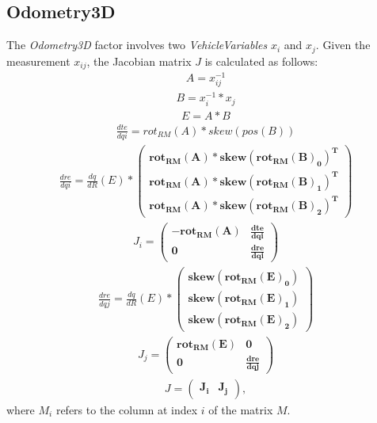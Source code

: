 \subsection{Odometry3D}
The \textit{Odometry3D} factor involves two \textit{VehicleVariables} $x_i$ and $x_j$. Given the measurement $x_{ij}$, the Jacobian matrix $J$ is calculated as follows:
\begin{align}
	A = x_{ij}^{-1}
\end{align}
\begin{align}
	B = x_i^{-1} * x_j
\end{align}
\begin{align}
	E = A * B
\end{align}
\begin{align}
	\frac{dte}{dqi} = rot_{RM}(A) * skew(pos(B))
\end{align}
\begin{align}
	\frac{dre}{dqi} = \frac{dq}{dR}(E) *
	\begin{pmatrix}
		\boldsymbol{rot_{RM}(A) * skew(rot_{RM}(B)_0)^T}\\
		\boldsymbol{rot_{RM}(A) * skew(rot_{RM}(B)_1)^T}\\
		\boldsymbol{rot_{RM}(A) * skew(rot_{RM}(B)_2)^T}
	\end{pmatrix}
\end{align}
\begin{align}
	J_i =
	\begin{pmatrix}
	\boldsymbol{-rot_{RM}(A)} & \boldsymbol{\frac{dte}{dqi}}\\
	\boldsymbol{0} & \boldsymbol{\frac{dre}{dqi}}
	\end{pmatrix}
\end{align}
\begin{align}
	\frac{dre}{dqj} = \frac{dq}{dR}(E) *
	\begin{pmatrix}
		\boldsymbol{skew(rot_{RM}(E)_0)}\\
		\boldsymbol{skew(rot_{RM}(E)_1)}\\
		\boldsymbol{skew(rot_{RM}(E)_2)}
	\end{pmatrix}
\end{align}
\begin{align}
	J_j =
	\begin{pmatrix}
		\boldsymbol{rot_{RM}(E)} &               \boldsymbol{0}\\
		          \boldsymbol{0} & \boldsymbol{\frac{dre}{dqj}}
	\end{pmatrix}
\end{align}
\begin{align}
	J =
	\begin{pmatrix}
		\boldsymbol{J_i} & \boldsymbol{J_j}
	\end{pmatrix},
\end{align}
where $M_i$ refers to the column at index $i$ of the matrix $M$.

